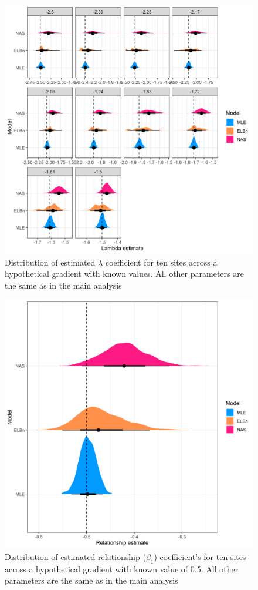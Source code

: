 \documentclass[
]{article}
\begin{document}
\begin{figure}
\centering
\includegraphics{figures/PLB_10_sites_est_b_density.png}
\caption{Distribution of estimated \(\lambda\) coefficient for ten sites
across a hypothetical gradient with known values. All other parameters
are the same as in the main analysis}
\end{figure}

\newpage

\begin{figure}
\centering
\includegraphics{figures/PLB_10_sites_relationship_density.png}
\caption{Distribution of estimated relationship (\(\beta_1\))
coefficient's for ten sites across a hypothetical gradient with known
value of 0.5. All other parameters are the same as in the main analysis}
\end{figure}
\end{document}
